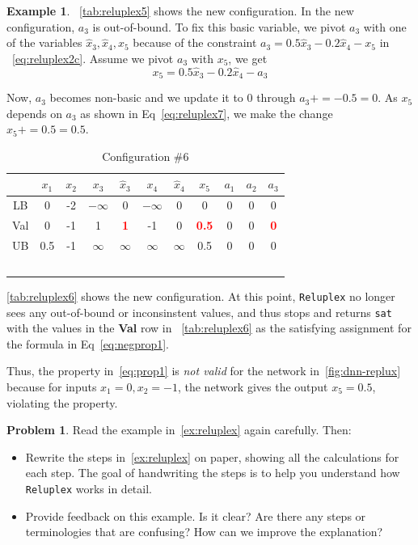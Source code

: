 \documentclass[oneside,11pt,dvipsnames]{book}
\numberwithin{equation}{section}
\theoremstyle{definition}
\newtheorem{example}{Example}[section]
\newtheorem{problem}{Problem}[section]
\theoremstyle{remark}
\newcommand{\red}[1]{\textcolor{red}{#1}}
\newcommand{\reluplex}{\texttt{Reluplex}}
\newcommand{\sat}{\texttt{sat}}
\begin{document}
\begin{example}
\begin{table}[h]
\end{table}

~\autoref{tab:reluplex5} shows the new configuration.
In the new configuration, $a_3$ is out-of-bound. To fix this basic variable, we pivot $a_3$ with one of the variables $\hat{x}_3, \hat{x}_4, x_5$ because of the constraint $a_3 = 0.5\hat{x}_3 -0.2 \hat{x}_4 - x_5$ in ~\autoref{eq:reluplex2c}. Assume we pivot $a_3$ with $x_5$, we get
\begin{equation}\label{eq:reluplex7}
  x_5 = 0.5\hat{x}_3 -0.2 \hat{x}_4 - a_3
\end{equation}

Now, $a_3$ becomes non-basic and we update it to 0 through $a_3+=-0.5=0$.  As $x_5$ depends on $a_3$ as shown in Eq~\ref{eq:reluplex7}, we make the change $x_5 += 0.5=0.5$.

\begin{table}[h]
    \caption{Configuration \#6}\label{tab:reluplex6}
    \centering
    \small
\begin{tabular}{ccccccccccc}
     & $x_1$ & $x_2$ & $x_3$ & $\hat{x}_3$ & $x_4$ & $\hat{x}_4$ & $x_5$ &$a_1$&$a_2$&$a_3$ \\
    \midrule
    LB & 0 & -2 & $-\infty$&0&$-\infty$& 0 & 0 & 0 & 0 &0\\
    Val& 0 & -1 & 1 & \textbf{\red{1}} & -1 & 0 & \textbf{\red{0.5}} & 0 & 0 & \textbf{\red{0}}\\
    UB & 0.5 & -1 &$\infty$&$\infty$&$\infty$&$\infty$&0.5& 0 & 0 & 0\\\
\end{tabular}

\end{table}

\autoref{tab:reluplex6} shows the new configuration.
At this point, \reluplex{} no longer sees any out-of-bound or inconsinstent values, and thus stops and returns \sat{} with the values in the \textbf{Val} row in ~\autoref{tab:reluplex6} as the satisfying assignment for the formula in Eq~\ref{eq:negprop1}.

Thus, the property in~\autoref{eq:prop1} is \emph{not valid} for the network in~\autoref{fig:dnn-replux} because for inputs $x_1=0,x_2=-1$, the network gives the output $x_5=0.5$, violating the property.
\end{example}


\begin{problem}\label{problem:reluplex-hand}
    Read the example in~\autoref{ex:reluplex} again carefully. Then:
    \begin{itemize}
      \item Rewrite the steps in~\autoref{ex:reluplex} on paper, showing all the calculations for each step. The goal of handwriting the steps is to help you understand how \reluplex{} works in detail.

    \item Provide feedback on this example.  Is it clear?  Are there any steps or terminologies that are confusing?  How can we improve the explanation? 
    \end{itemize}
\end{problem}
\end{document}
